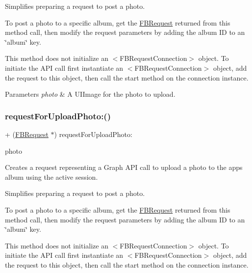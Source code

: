 Simplifies preparing a request to post a photo.

To post a photo to a specific album, get the {\ttfamily \hyperlink{interfaceFBRequest}{F\+B\+Request}} returned from this method call, then modify the request parameters by adding the album ID to an \char`\"{}album\char`\"{} key.

This method does not initialize an $<$\+F\+B\+Request\+Connection$>$ object. To initiate the A\+PI call first instantiate an $<$\+F\+B\+Request\+Connection$>$ object, add the request to this object, then call the {\ttfamily start} method on the connection instance.


\begin{DoxyParams}{Parameters}
{\em photo} & A {\ttfamily U\+I\+Image} for the photo to upload. \\
\hline
\end{DoxyParams}
\mbox{\label{interfaceFBRequest_a871fdb57a3c9907a5d2b788ca442c586}} 
\subsubsection{\texorpdfstring{request\+For\+Upload\+Photo\+:()}{requestForUploadPhoto:()}\hspace{0.1cm}{\footnotesize\ttfamily [2/5]}}
{\footnotesize\ttfamily + (\hyperlink{interfaceFBRequest}{F\+B\+Request} $\ast$) request\+For\+Upload\+Photo\+: \begin{DoxyParamCaption}\item[{(U\+I\+Image $\ast$)}]{photo }\end{DoxyParamCaption}}

Creates a request representing a Graph A\+PI call to upload a photo to the app\textquotesingle{}s album using the active session.

Simplifies preparing a request to post a photo.

To post a photo to a specific album, get the {\ttfamily \hyperlink{interfaceFBRequest}{F\+B\+Request}} returned from this method call, then modify the request parameters by adding the album ID to an \char`\"{}album\char`\"{} key.

This method does not initialize an $<$\+F\+B\+Request\+Connection$>$ object. To initiate the A\+PI call first instantiate an $<$\+F\+B\+Request\+Connection$>$ object, add the request to this object, then call the {\ttfamily start} method on the connection instance.


